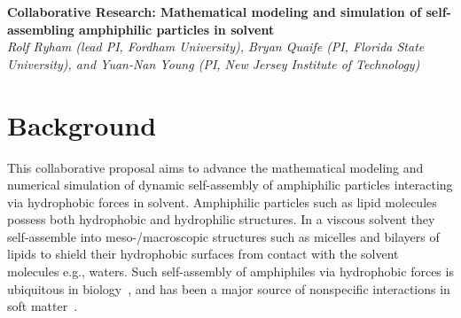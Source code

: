 \noindent
{\bf Collaborative Research: Mathematical modeling and simulation of
self-assembling amphiphilic particles in solvent} \\
{\em Rolf Ryham (lead PI, Fordham University),
Bryan Quaife (PI, Florida State University), and
Yuan-Nan Young (PI, New Jersey Institute of Technology)}

\section{Background}
\label{sec:background}
This collaborative proposal aims to advance
the mathematical modeling and numerical simulation
of dynamic self-assembly of amphiphilic particles interacting
via hydrophobic forces in solvent.
Amphiphilic particles such as lipid molecules possess both hydrophobic
and hydrophilic structures. In a viscous solvent they self-assemble into
meso-/macroscopic structures such as micelles and bilayers of lipids to
shield their hydrophobic surfaces from contact with the solvent
molecules e.g., waters. Such self-assembly of amphiphiles via hydrophobic
forces is ubiquitous in biology~\cite{Israelachvili1954},
and has been a major source of nonspecific interactions 
in soft matter~\cite{Sanchez-IglesiasEtAl2012_ACSNano,
AltantzisEtAl2013_PSC, XieYangLuEtAl2020_COCIS}. 


